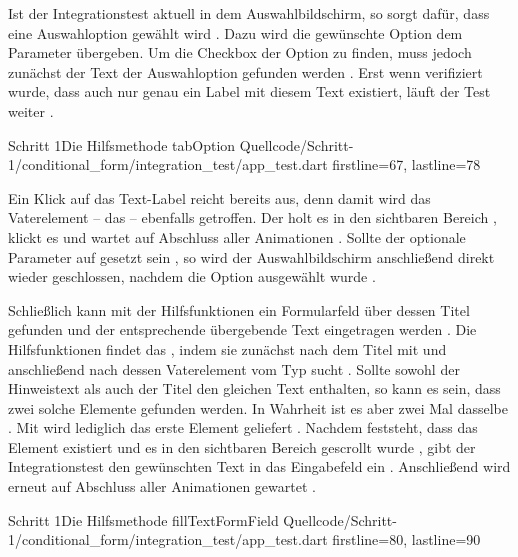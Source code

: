 Ist der Integrationstest aktuell in dem Auswahlbildschirm, so sorgt  dafür, dass eine Auswahloption gewählt wird \Lst{\ref{lst:Schritt1HilfsmethodeTabOption}}.
Dazu wird die gewünschte Option dem Parameter  übergeben.
Um die Checkbox der Option zu finden, muss jedoch zunächst der Text der Auswahloption gefunden werden .
Erst wenn verifiziert wurde, dass auch nur genau ein Label mit diesem Text existiert, läuft der Test weiter . 

\begin{alexlisting}{Schritt 1}{Die Hilfsmethode tabOption}
  {Quellcode/Schritt-1/conditional_form/integration_test/app_test.dart}
  {firstline=67, lastline=78}
  \label{lst:Schritt1HilfsmethodeTabOption}
\end{alexlisting}

Ein Klick auf das Text-Label reicht bereits aus, denn damit wird das Vaterelement -- das  -- ebenfalls getroffen.
Der  holt es in den sichtbaren Bereich , klickt es  und wartet auf Abschluss aller Animationen .
Sollte der optionale Parameter  auf  gesetzt sein , so wird der Auswahlbildschirm anschließend direkt wieder geschlossen, nachdem die Option ausgewählt wurde  . 
  
Schließlich kann mit der Hilfsfunktionen  ein Formularfeld über dessen Titel gefunden und der entsprechende übergebende Text eingetragen werden \Lst{\ref{lst:Schritt1HilfsmethodeFillTextFormField}}.
Die Hilfsfunktionen findet das , indem sie zunächst nach dem Titel mit  und anschließend nach dessen Vaterelement vom Typ  sucht . Sollte sowohl der Hinweistext als auch der Titel den gleichen Text enthalten, so kann es sein, dass zwei solche Elemente gefunden werden. In Wahrheit ist es aber zwei Mal dasselbe . Mit  wird lediglich das erste Element geliefert .
Nachdem feststeht, dass das Element existiert  und es in den sichtbaren Bereich gescrollt wurde , gibt der Integrationstest den gewünschten Text in das Eingabefeld ein .
Anschließend wird erneut auf Abschluss aller Animationen gewartet .

\begin{alexlisting}{Schritt 1}{Die Hilfsmethode fillTextFormField}
  {Quellcode/Schritt-1/conditional_form/integration_test/app_test.dart}
  {firstline=80, lastline=90}
  \label{lst:Schritt1HilfsmethodeFillTextFormField}
\end{alexlisting}

